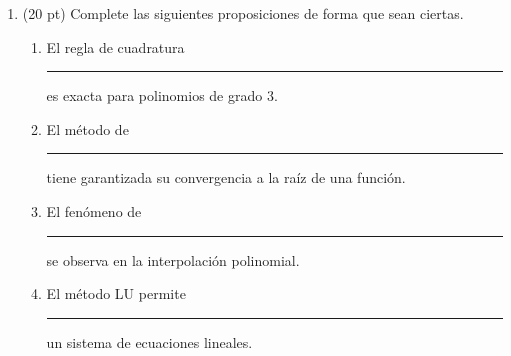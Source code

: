 \documentclass[11pt]{article}
\begin{document}
\begin{enumerate}
\begin{enumerate}
\vspace{1cm}
\item (20 pt) Complete las siguientes proposiciones de forma que sean ciertas.

\vspace{1cm}
\begin{enumerate}
	\item El regla de cuadratura \rule{5cm}{0.4pt} es exacta para polinomios de grado $3$. 
    \item \vspace{5mm} El m\'etodo de \rule{5cm}{0.4pt} tiene garantizada su convergencia a la ra\'iz de una funci\'on.
    \item \vspace{5mm} El fen\'omeno de \rule{5cm}{0.4pt} se observa en la interpolaci\'on polinomial.
   	\item \vspace{5mm} El m\'etodo LU permite \rule{5cm}{0.4pt} un sistema de ecuaciones lineales.
\end{enumerate}
\end{enumerate}
\end{enumerate}
\end{document}
